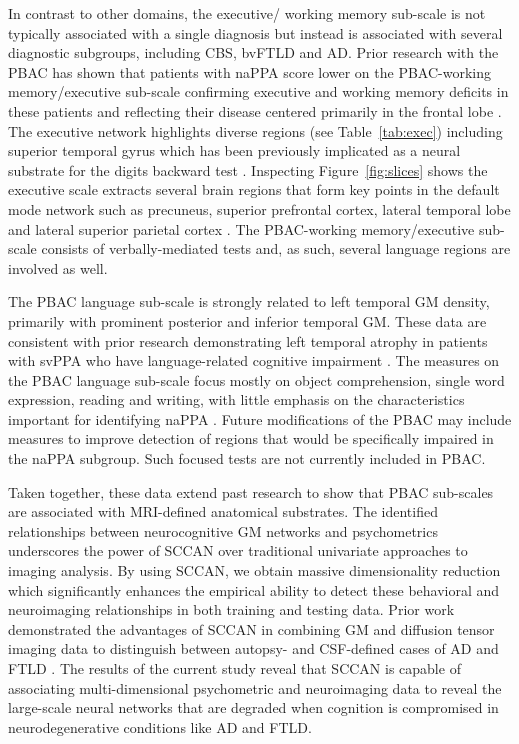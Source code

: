 \documentclass[preprint,authoryear,12pt]{elsarticle}
\begin{document}
In contrast to other domains, the executive/ working memory sub-scale is not typically associated with a single diagnosis but instead is associated with several diagnostic subgroups, including CBS, bvFTLD and AD.  Prior research with the PBAC has shown that patients with naPPA score lower on the PBAC-working memory/executive sub-scale \citet{libon_philadelphia_2011,Libon2007} confirming executive and working memory deficits in these patients and reflecting their disease centered primarily in the frontal lobe \citet{Gunawardena2010,Rogalski2011}.  The executive network highlights diverse regions (see Table~\ref{tab:exec}) including superior temporal gyrus which has been previously implicated as a neural substrate for the digits backward test \citet{Li2012}.  Inspecting Figure~\ref{fig:slices} shows the executive scale extracts several brain regions that form key points in the default mode network such as precuneus, superior prefrontal cortex, lateral temporal lobe and lateral superior parietal cortex \citet{Buckner2008}.  The PBAC-working memory/executive sub-scale consists of verbally-mediated tests and, as such, several language regions are involved as well.  

The PBAC language sub-scale is strongly related to left temporal GM density, primarily with prominent posterior and inferior temporal GM.  These data are consistent with prior research demonstrating left temporal atrophy in patients with svPPA who have language-related cognitive impairment \citet{Bonner2009,Williams20051042}.  The measures on the PBAC language sub-scale focus mostly on object comprehension, single word expression, reading and writing, with little emphasis on the characteristics important for identifying naPPA \citet{Gorno-Tempini20111006}.  Future modifications of the PBAC may include measures to improve detection of regions that would be specifically impaired in the naPPA subgroup.  Such focused tests are not currently included in PBAC.


Taken together, these data extend past research to show that PBAC sub-scales are associated with MRI-defined anatomical substrates.  The identified relationships between neurocognitive GM networks and psychometrics underscores the power of SCCAN over traditional univariate approaches to imaging analysis.  By using SCCAN, we obtain massive dimensionality reduction which significantly enhances the empirical ability to detect these behavioral and neuroimaging relationships in both training and testing data.  Prior work demonstrated the advantages of SCCAN in combining GM and diffusion tensor imaging data to distinguish between autopsy- and CSF-defined cases of AD and FTLD \citet{Avants2010b}.  The results of the current study reveal that SCCAN is capable of associating multi-dimensional psychometric and neuroimaging data to reveal the large-scale neural networks that are degraded when cognition is compromised in neurodegenerative conditions like AD and FTLD.
\end{document}

